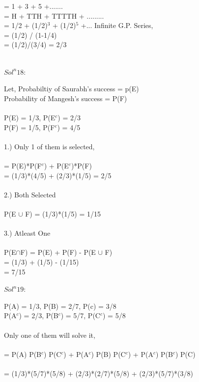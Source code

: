 \documentclass{article}
\begin{document}
= 1 + 3 + 5 +....... \\

= H + TTH + TTTTH + ......... \\

= 1/2 + (1/2)$^3$ + (1/2)$^5$ +...
Infinite G.P. Series, \\

= (1/2) / (1-1/4) \\

= (1/2)/(3/4) = 2/3 \\\\
\\
\textbf{$Sol^n 18:$} \\ \\
Let, Probabiltiy of Saurabh's success = p(E) \\
Probability of Mangesh's success = P(F) \\ \\
P(E) = 1/3, P(E$^c$) = 2/3 \\
P(F) = 1/5, P(F$^c$) = 4/5 \\ \\
1.) Only 1 of them is selected, \\\\
= P(E)*P(F$^c$) + P(E$^c$)*P(F)\\
= (1/3)*(4/5) + (2/3)*(1/5) = 2/5 \\\\
2.) Both Selected \\\\
P(E $\cup$ F) = (1/3)*(1/5) = 1/15 \\\\
3.) Atleast One \\\\
P(E$\cap$F) = P(E) + P(F) - P(E $\cup$ F) \\
= (1/3) + (1/5) - (1/15) \\
= 7/15\\\\
\textbf{$Sol^n 19:$} \\ \\
P(A) = 1/3, P(B) = 2/7, P(c) = 3/8 \\
P(A$^c$) = 2/3, P(B$^c$) = 5/7, P(C$^c$) = 5/8 \\\\
Only one of them will solve it, \\\\
= P(A) P(B$^c$) P(C$^c$) + P(A$^c$) P(B) P(C$^c$) + P(A$^c$) P(B$^c$) P(C) \\\\
= (1/3)*(5/7)*(5/8) + (2/3)*(2/7)*(5/8) + (2/3)*(5/7)*(3/8) \\\\
\end{document}
